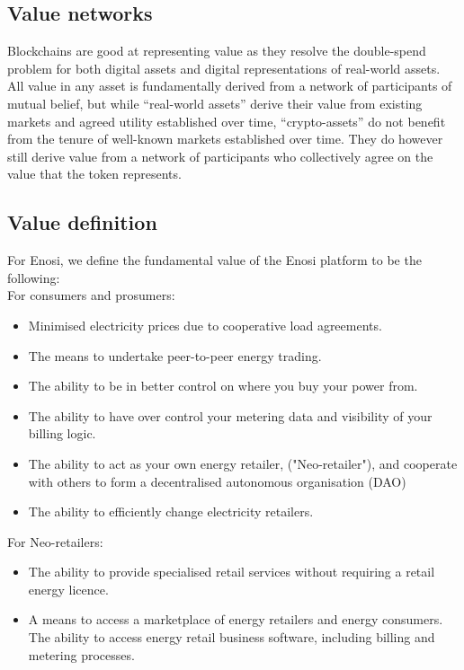 \documentclass{article}
\theoremstyle{definition}
\theoremstyle{plain} %
\begin{document}
\subsection{Value networks}

Blockchains are good at representing value as they resolve the double-spend problem for both digital assets and digital representations of real-world assets. All value in any asset is fundamentally derived from a network of participants of mutual belief, but while “real-world assets” derive their value from existing markets and agreed utility established over time, “crypto-assets” do not benefit from the tenure of well-known markets established over time. They do however still derive value from a network of participants who collectively agree on the value that the token represents.

\subsection{Value definition}

For Enosi, we define the fundamental value of the Enosi platform to be the following:\\

\noindent For consumers and prosumers:

\begin{itemize}
\item{Minimised electricity prices due to cooperative load agreements.}
\item{The means to undertake peer-to-peer energy trading.}
\item{The ability to be in better control on where you buy your power from.}
\item{The ability to have  over control your metering data and visibility of your billing logic.}
\item{The ability to act as your own energy retailer, ("Neo-retailer"), and cooperate with others to form a decentralised autonomous organisation (DAO)}
\item{The ability to efficiently change electricity retailers.\\}
\end{itemize}

\noindent For Neo-retailers:

\begin{itemize}
\item{The ability to provide specialised retail services without requiring a retail energy licence.}
\item{A means to access a marketplace of energy retailers and energy consumers.
The ability to access energy retail business software, including billing and metering processes.\\}
\end{itemize}
\end{document}
